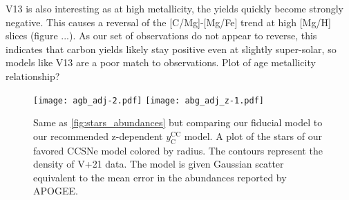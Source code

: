 \documentclass[fleqn,usenatbib]{mnras}
\begin{document}
V13 is also interesting as at high metallicity, the yields quickly become strongly negative. This causes a reversal of the [C/Mg]-[Mg/Fe] trend at high [Mg/H] slices (figure ...). As our set of observations do not appear to reverse, this indicates that carbon yields likely stay positive even at slightly super-solar, so models like V13 are a poor match to observations. 
Plot of age metallicity relationship?


\begin{figure}
\texttt{[image: agb\_adj-2.pdf]}
\texttt{[image: abg\_adj\_z-1.pdf]}

\caption{Same as \ref{fig:stars_abundances} but comparing our fiducial model to our recommended z-dependent $y_\text{C}^\text{CC}$ model. A plot of the stars of our favored CCSNe model colored by radius. The contours represent the density of V+21 data. The model is given Gaussian scatter equivalent to the mean error in the abundances reported by APOGEE. }
\end{figure}



\bsp	%
\label{lastpage}
\end{document}
